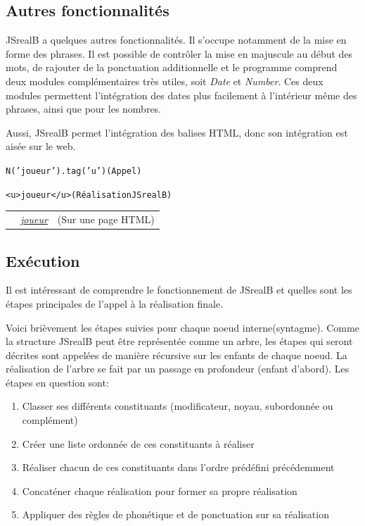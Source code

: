 \documentclass[11pt]{article} %
\newcommand{\system}[1]{\textsf{#1}}
\newcommand{\JSB}{\system{JSrealB}}
\newcommand{\real}[1]{\emph{#1}}
\begin{document}
\subsection{Autres fonctionnalités}

\JSB{} a quelques autres fonctionnalités. Il s'occupe notamment de
la mise en forme des phrases. Il est possible de contrôler la mise
en majuscule au début des mots, de rajouter de la ponctuation additionnelle
et le programme comprend deux modules complémentaires très utiles,
soit \emph{Date} et \emph{Number}. Ces deux modules permettent l'intégration
des dates plus facilement à l'intérieur même des phrases, ainsi que
pour les nombres. 

Aussi, \JSB{} permet l'intégration des balises HTML, donc son intégration
est aisée sur le web. \\
\begin{alltt}
  N('joueur').tag('u')    (Appel)
    
       <u>joueur</u>      (Réalisation \JSB{})
\end{alltt}
\begin{tabular}{p{1.4cm} p{2.8cm} c}
  & \real{\underline{joueur}} & (Sur une page HTML)
\end{tabular}



\subsection{Exécution}

Il est intéressant de comprendre le fonctionnement de \JSB{} et quelles
sont les étapes principales de l'appel à la réalisation finale.

Voici brièvement les étapes suivies pour chaque noeud interne(syntagme).
Comme la structure \JSB{} peut être représentée comme un arbre, les
étapes qui seront décrites sont appelées de manière récursive sur les
enfants de chaque noeud. La réalisation de l'arbre se fait par un
passage en profondeur (enfant d'abord). Les étapes en question sont:
\begin{enumerate}
\item Classer ses différents constituants (modificateur, noyau, subordonnée
ou complément)
\item Créer une liste ordonnée de ces constituants à réaliser
\item Réaliser chacun de ces constituants dans l'ordre prédéfini précédemment
\item Concaténer chaque réalisation pour former sa propre réalisation
\item Appliquer des règles de phonétique et de ponctuation sur sa réalisation
\end{enumerate}
\end{document}
